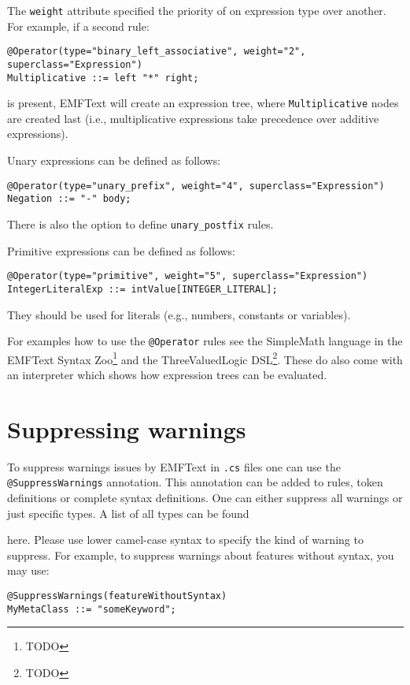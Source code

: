 The \texttt{weight} attribute specified the priority of on expression type over
another. For example, if a second rule:

\begin{lstlisting}
@Operator(type="binary_left_associative", weight="2", superclass="Expression")
Multiplicative ::= left "*" right;
\end{lstlisting}

is present, EMFText will create an expression tree, where
\texttt{Multiplicative} nodes are created last (i.e., multiplicative expressions 
take precedence over additive expressions).

Unary expressions can be defined as follows:

\begin{lstlisting}
@Operator(type="unary_prefix", weight="4", superclass="Expression")	
Negation ::= "-" body;
\end{lstlisting}

There is also the option to define \texttt{unary\_postfix} rules.

Primitive expressions can be defined as follows:

\begin{lstlisting}
@Operator(type="primitive", weight="5", superclass="Expression")
IntegerLiteralExp ::= intValue[INTEGER_LITERAL];
\end{lstlisting}

They should be used for literals (e.g., numbers, constants or variables).

For examples how to use the \texttt{@Operator} rules see the SimpleMath
language in the EMFText Syntax Zoo\footnote{TODO} and the ThreeValuedLogic DSL\footnote{TODO}. 
These do also come with an interpreter which shows how expression trees can be 
evaluated.

\section{Suppressing warnings}

To suppress warnings issues by EMFText in \texttt{.cs} files one can use the
\texttt{@SuppressWarnings} annotation. This annotation can be added to rules,
token definitions or complete syntax definitions. One can either suppress all 
warnings or just specific types. A list of all types can be found 

here. Please use lower camel-case syntax to specify the kind of warning to
suppress. For example, to suppress warnings about features without syntax, you may use:

\begin{lstlisting}
@SuppressWarnings(featureWithoutSyntax)
MyMetaClass ::= "someKeyword";
\end{lstlisting}
